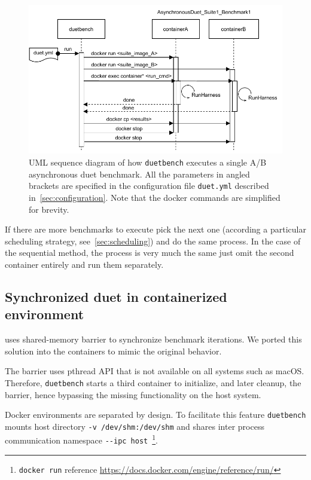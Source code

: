 \begin{figure}
	\centering
	\includegraphics[width=\linewidth]{./figures/duetbench-sequence.drawio.pdf}
	\caption{
        UML sequence diagram of how \lstinline{duetbench} executes a single A/B asynchronous duet benchmark.
        All the parameters in angled brackets are specified in the configuration file \lstinline{duet.yml} described in~\cref{sec:configuration}.
        Note that the docker commands are simplified for brevity.
	}
	\label{fig:duetbench_sequence}
\end{figure}

If there are more benchmarks to execute pick the next one (according a particular scheduling strategy, see~\cref{sec:scheduling}) and do the same process.
In the case of the sequential method, the process is very much the same just omit the second container entirely and run them separately.

\subsection{Synchronized duet in containerized environment}

\citet{bulej2020duet} uses shared-memory barrier to synchronize benchmark iterations.
We ported this solution into the containers to mimic the original behavior.

The barrier uses pthread API that is not available on all systems such as macOS.
Therefore, \lstinline{duetbench} starts a third container to initialize, and later cleanup, the barrier, hence bypassing the missing functionality on the host system.

Docker environments are separated by design.
To facilitate this feature \lstinline{duetbench} mounts host directory \lstinline{-v /dev/shm:/dev/shm} and shares inter process communication namespace \lstinline{--ipc host}~\footnote{\lstinline{docker run} reference \url{https://docs.docker.com/engine/reference/run/}}.

